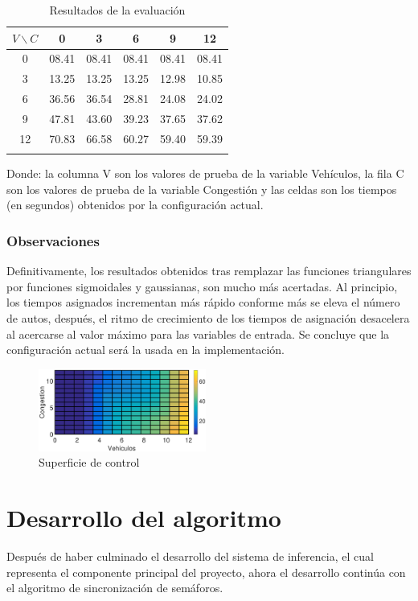 \begin{longtable}[c]{cccccc} \toprule
	$V \backslash C$ &  0 & 3 & 6 & 9 & 12 \\ \midrule
	0 & 08.41 & 08.41 & 08.41 & 08.41 & 08.41 \\
	3 & 13.25 & 13.25 & 13.25 & 12.98 & 10.85 \\
	6 & 36.56 & 36.54 & 28.81 & 24.08 & 24.02 \\
	9 & 47.81 & 43.60 & 39.23 & 37.65 & 37.62 \\
	12& 70.83 & 66.58 & 60.27 & 59.40 & 59.39 \\
	\caption[Resultados de la evaluación (configuración \textit{D})]{Resultados de la evaluación}
\end{longtable}

Donde: la columna V son los valores de prueba de la variable Vehículos, la fila C son los valores de  prueba de la variable Congestión y las celdas son los tiempos (en segundos) obtenidos por la configuración actual.

\subsubsection{Observaciones}

\begin{multicols}{2}
	Definitivamente, los resultados obtenidos tras remplazar las funciones triangulares por funciones sigmoidales y gaussianas, son mucho más acertadas. Al principio, los tiempos asignados incrementan más rápido conforme más se eleva el número de autos, después, el ritmo de crecimiento de los tiempos de asignación desacelera al acercarse al valor máximo para las variables de entrada. Se concluye que la configuración actual será la usada en la implementación.
	\begin{figure}[H]
	\includegraphics[width=0.49\textwidth]{Surfaces/Surface2D_D.eps}
	\caption[Superficie de control (configuración \textit{D})]{Superficie de control}
\end{figure}
\end{multicols}
\pagebreak

\section{Desarrollo del algoritmo}\label{section:desarrolloAlgoritmo}
Después de haber culminado el desarrollo del sistema de inferencia, el cual representa el componente principal del proyecto, ahora el desarrollo continúa con el algoritmo de sincronización de semáforos.

